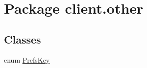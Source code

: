 \hypertarget{namespaceclient_1_1other}{}\section{Package client.\+other}
\label{namespaceclient_1_1other}
\subsection*{Classes}
\begin{DoxyCompactItemize}
\item 
enum \hyperlink{enumclient_1_1other_1_1_prefs_key}{Prefs\+Key}
\end{DoxyCompactItemize}
